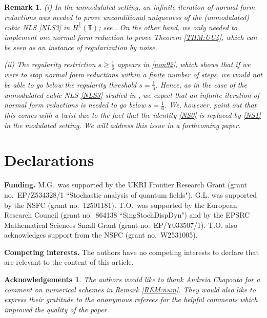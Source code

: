 \documentclass[letterpaper, 11pt,  reqno]{amsart}
\newtheorem{remark}[theorem]{Remark}
\newcommand{\1}{\hspace{0.5mm}\text{I}\hspace{0.5mm}}
\newcommand{\noi}{\noindent}
\newcommand{\T}{\mathbb{T}}
\newtheorem*{ackno}{Acknowledgements}
\numberwithin{equation}{section}
\numberwithin{theorem}{section}
\begin{document}
\begin{remark}\label{REM:NLS2}\rm
(i)
In the unmodulated setting, 
an infinite iteration of normal form reductions
was needed to prove unconditional uniqueness
of the (unmodulated) cubic NLS \eqref{NLS3} in $H^\frac 16(\T)$;
see \cite{GKO}.
On the other hand, we only needed to 
implement one normal form reduction
to prove Theorem \ref{THM:UU4},
which can be seen as an instance of regularization by noise.



\medskip

\noi
(ii)
The regularity restriction $s \ge \frac 16$
appears in 
\eqref{non92}, 
which shows that if we were to stop normal form reductions
within a finite number of steps, 
we would not be able to go below 
the regularity threshold $ s= \frac 16$.
Hence, as in  the case of the unmodulated cubic NLS  \eqref{NLS3}
studied in 
 \cite{GKO, OW}, 
we expect that an infinite iteration of normal form reductions is needed
to go below $ s= \frac 16$.
We, however,  point out
that this comes with a twist due to 
the fact that the identity \eqref{NS0}
is replaced by 
\eqref{NS1} in the modulated setting.
We will address this issue in a forthcoming paper.




\end{remark}



\section{Declarations}

\noi
{\bf Funding.}
M.G.~was supported by 
the UKRI Frontier Research Grant 
(grant no.~EP/Z534328/1 ``Stochastic analysis of quantum fields"). 
G.L. was supported by the NSFC (grant no.~12501181).
T.O.~was supported by the European Research Council (grant no.~864138 ``SingStochDispDyn")
and  by the EPSRC 
Mathematical Sciences
Small Grant  (grant no.~EP/Y033507/1).
T.O. also 
acknowledges support from  
the NSFC (grant no.~W2531005).





\medskip

\noi
{\bf Competing interests.}
The authors have no competing interests to declare that are relevant to the content of this article.



\begin{ackno}\rm
The authors would like to thank Andreia Chapouto
for a comment on numerical schemes
in Remark \ref{REM:num}.
They would also  like to express their gratitude to the anonymous
referees for the helpful comments which improved the quality of the paper.

\end{ackno}
\end{document}
